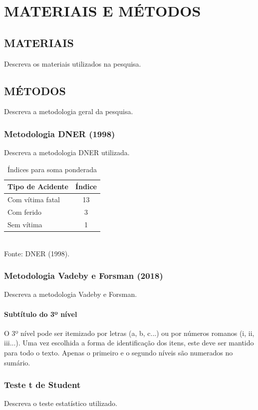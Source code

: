 \chapter{MATERIAIS E MÉTODOS}
\label{capitulo2}

\section{MATERIAIS}

Descreva os materiais utilizados na pesquisa.

\section{MÉTODOS}

Descreva a metodologia geral da pesquisa.

\subsection{Metodologia DNER (1998)}

Descreva a metodologia DNER utilizada.

\begin{table}[htbp]
  \centering
  \caption{Índices para soma ponderada}
  \label{tab:indices_ponderada}
  \small
  \begin{tabular}{lc}
    \hline
    \textbf{Tipo de Acidente} & \textbf{Índice} \\
    \hline
    Com vítima fatal & 13 \\
    Com ferido & 3 \\
    Sem vítima & 1 \\
    \hline
  \end{tabular}
  \\[0.2cm]
  {\small Fonte: DNER (1998).}
\end{table}

\subsection{Metodologia Vadeby e Forsman (2018)}

Descreva a metodologia Vadeby e Forsman.

\subsubsection{Subtítulo do 3º nível}

O 3º nível pode ser itemizado por letras (a, b, c...) ou por números romanos (i, ii, iii...). Uma vez escolhida a forma de identificação dos itens, este deve ser mantido para todo o texto. Apenas o primeiro e o segundo níveis são numerados no sumário.

\subsection{Teste t de Student}

Descreva o teste estatístico utilizado.
